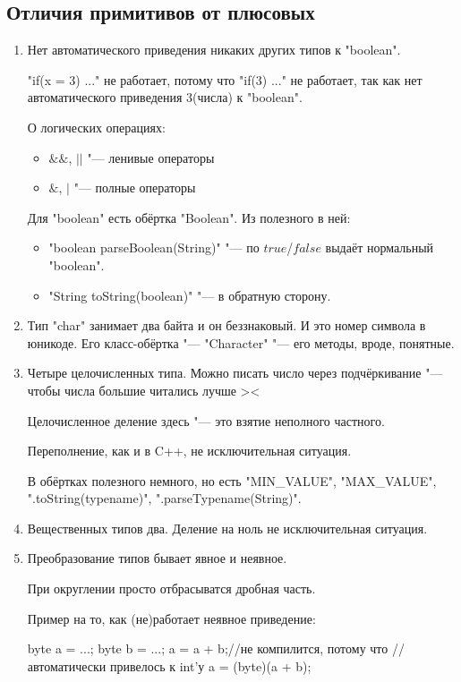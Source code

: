 \subsection{Отличия примитивов от плюсовых}

\begin{enumerate}

	\item Нет автоматического приведения никаких других типов 
		к \java"boolean".
	
		\java"if(x = 3) {...}" не работает, 
		потому что \java"if(3) {...}" не работает, 
		так как нет автоматического приведения $3$(числа) 
		к \java"boolean".

		О логических операциях:
		\begin{itemize}
			\item $\&\&$, $||$ "--- ленивые операторы
			\item $\&$, $|$ "--- полные операторы
		\end{itemize}

		Для \java"boolean" есть обёртка \java"Boolean". 
		Из полезного в ней:
		\begin{itemize}
			\item \java"boolean parseBoolean(String)" "--- 
				по $true$/$false$ выдаёт 
				нормальный \java"boolean".
			\item \java"String toString(boolean)" "--- 
				в обратную сторону.
		\end{itemize}


	\item Тип \java"char" занимает два байта и он беззнаковый. 
		И это номер символа в юникоде.
		Его класс-обёртка "--- \java"Character" "--- 
		его методы, вроде, понятные.


	\item Четыре целочисленных типа.
		Можно писать число через подчёркивание "--- 
		чтобы числа большие читались лучше ><

		Целочисленное деление здесь "--- 
		это взятие неполного частного.

		Переполнение, как и в C++, не исключительная ситуация.

		В обёртках полезного немного, но есть 
		\java"MIN_VALUE", 
		\java"MAX_VALUE", 
		\java".toString(typename)", 
		\java".parseTypename(String)".


	\item Вещественных типов два.
		Деление на ноль не исключительная ситуация.


	\item Преобразование типов бывает явное и неявное.
		
		При округлении просто отбрасыватся дробная часть.

		Пример на то, как (не)работает неявное приведение:
		\begin{javacode}
		byte a = ...;
		byte b = ...;
		a = a + b;//не компилится, потому что
			  //автоматически привелось к int'у
		a = (byte)(a + b);
	\end{javacode}

\end{enumerate}



